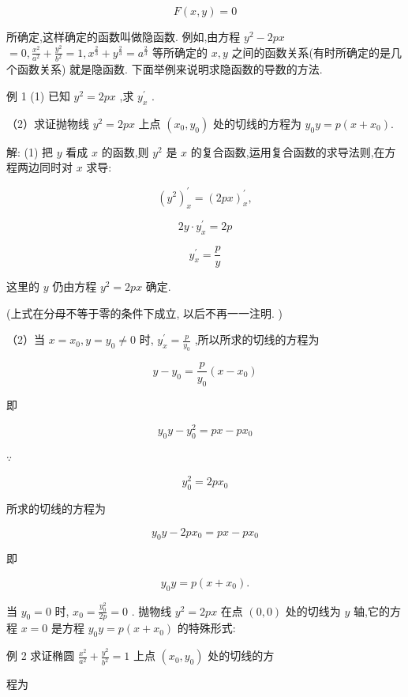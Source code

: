 \documentclass[lang=cn,newtx,10pt,scheme=chinese]{elegantbook}
\begin{document}
\[
F\left( {x,y}\right) = 0
\]

所确定,这样确定的函数叫做隐函数. 例如,由方程 \({y}^{2} - {2px}\) \(= 0,\frac{{x}^{2}}{{a}^{2}} + \frac{{y}^{2}}{{b}^{2}} = 1,{x}^{\frac{2}{3}} + {y}^{\frac{2}{3}} = {a}^{\frac{2}{3}}\) 等所确定的 \(x,y\) 之间的函数关系(有时所确定的是几个函数关系) 就是隐函数. 下面举例来说明求隐函数的导数的方法.

例 1 (1) 已知 \({y}^{2} = {2px}\) ,求 \({y}_{x}^{\prime }\) .

（2）求证抛物线 \({y}^{2} = {2px}\) 上点 \(\left( {{x}_{0},{y}_{0}}\right)\) 处的切线的方程为 \({y}_{0}y = p\left( {x + {x}_{0}}\right) .\)

解: (1) 把 \(y\) 看成 \(x\) 的函数,则 \({y}^{2}\) 是 \(x\) 的复合函数,运用复合函数的求导法则,在方程两边同时对 \(x\) 求导:

\[
{\left( {y}^{2}\right) }_{x}^{\prime } = {\left( 2px\right) }_{x}^{\prime },
\]

\[
{2y} \cdot {y}_{x}^{\prime } = {2p}
\]

\[
{y}_{x}^{\prime } = \frac{p}{y}
\]

这里的 \(y\) 仍由方程 \({y}^{2} = {2px}\) 确定.

(上式在分母不等于零的条件下成立, 以后不再一一注明. )

（2）当 \(x = {x}_{0},y = {y}_{0} \neq 0\) 时, \({y}_{x}^{\prime } = \frac{p}{{y}_{0}}\) ,所以所求的切线的方程为

\[
y - {y}_{0} = \frac{p}{{y}_{0}}\left( {x - {x}_{0}}\right)
\]

即

\[
{y}_{0}y - {y}_{0}^{2} = {px} - p{x}_{0}
\]

\(\because\)

\[
{y}_{0}^{2} = {2p}{x}_{0}
\]

所求的切线的方程为

\[
{y}_{0}y - {2p}{x}_{0} = {px} - p{x}_{0}
\]

即

\[
{y}_{0}y = p\left( {x + {x}_{0}}\right) .
\]

当 \({y}_{0} = 0\) 时, \({x}_{0} = \frac{{y}_{0}^{2}}{2p} = 0\) . 抛物线 \({y}^{2} = {2px}\) 在点 \(\left( {0,0}\right)\) 处的切线为 \(y\) 轴,它的方程 \(x = 0\) 是方程 \({y}_{0}y = p\left( {x + {x}_{0}}\right)\) 的特殊形式:

例 2 求证椭圆 \(\frac{{x}^{2}}{{a}^{2}} + \frac{{y}^{2}}{{b}^{2}} = 1\) 上点 \(\left( {{x}_{0},{y}_{0}}\right)\) 处的切线的方

程为
\end{document}
